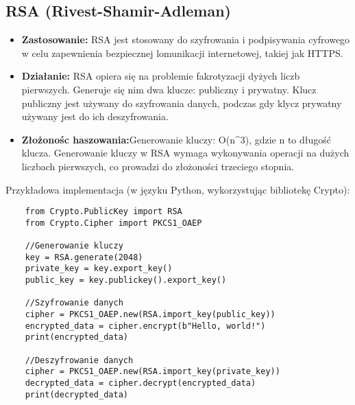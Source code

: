 \documentclass[options]{article}
\begin{document}
\subsection*{RSA (Rivest-Shamir-Adleman)}
\begin{itemize}
    \item \textbf{Zastosowanie:} RSA jest stosowany do szyfrowania i podpisywania cyfrowego w celu zapewnienia bezpiecznej lomunikacji internetowej, takiej jak HTTPS.
    \item \textbf{Działanie:} RSA opiera się na problemie fakrotyzacji dyżych liczb pierwszych. Generuje się nim dwa klucze: publiczny i prywatny. Klucz publiczny jest używany do szyfrowania danych, podczas gdy klycz prywatny używany jest do ich deszyfrowania.
    \item \textbf{Złożonośc haszowania:}Generowanie kluczy: O(n^3), gdzie n to długość klucza. Generowanie kluczy w RSA wymaga wykonywania operacji na dużych liczbach pierwszych, co prowadzi do złożoności trzeciego stopnia.
\end{itemize}
    Przykładowa implementacja (w języku Python, wykorzystując bibliotekę Crypto):
\begin{verbatim}
    from Crypto.PublicKey import RSA
    from Crypto.Cipher import PKCS1_OAEP

    //Generowanie kluczy
    key = RSA.generate(2048)
    private_key = key.export_key()
    public_key = key.publickey().export_key()

    //Szyfrowanie danych
    cipher = PKCS1_OAEP.new(RSA.import_key(public_key))
    encrypted_data = cipher.encrypt(b"Hello, world!")
    print(encrypted_data)

    //Deszyfrowanie danych
    cipher = PKCS1_OAEP.new(RSA.import_key(private_key))
    decrypted_data = cipher.decrypt(encrypted_data)
    print(decrypted_data)
\end{verbatim}
\end{document}
